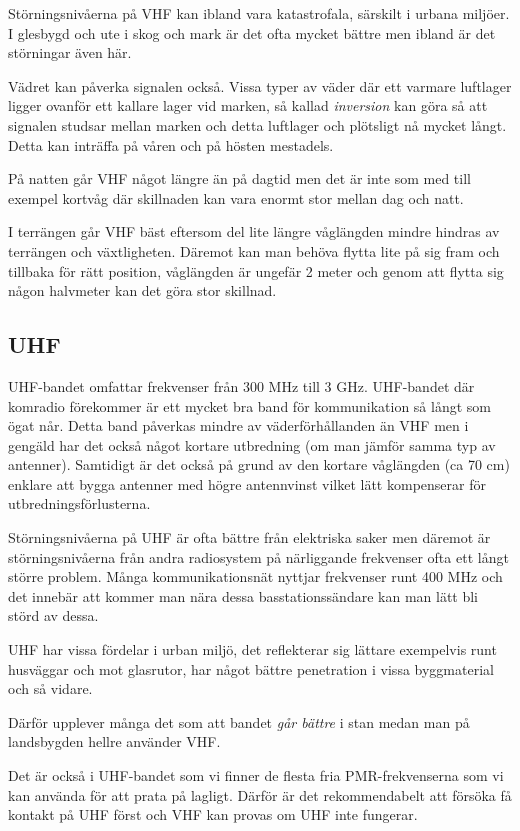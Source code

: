 Störningsnivåerna på VHF kan ibland vara katastrofala, särskilt i urbana miljöer. I glesbygd och ute i skog och mark är det ofta mycket bättre men ibland är det störningar även här. 

Vädret kan påverka signalen också. Vissa typer av väder där ett varmare luftlager ligger ovanför ett kallare lager vid marken, så kallad \textit{inversion} kan göra så att signalen studsar mellan marken och detta luftlager och plötsligt nå mycket långt. Detta kan inträffa på våren och på hösten mestadels.

På natten går VHF något längre än på dagtid men det är inte som med till exempel kortvåg där skillnaden kan vara enormt stor mellan dag och natt.

I terrängen går VHF bäst eftersom del lite längre våglängden mindre hindras av terrängen och växtligheten. Däremot kan man behöva flytta lite på sig fram och tillbaka för rätt position, våglängden är ungefär 2 meter och genom att flytta sig någon halvmeter kan det göra stor skillnad.

\subsection{UHF}

UHF-bandet omfattar frekvenser från 300 MHz till 3 GHz. UHF-bandet där komradio förekommer är ett mycket bra band för kommunikation så långt som ögat når. Detta band påverkas mindre av väderförhållanden än VHF men i gengäld har det också något kortare utbredning (om man jämför samma typ av antenner). Samtidigt är det också på grund av den kortare våglängden (ca 70 cm) enklare att bygga antenner med högre antennvinst vilket lätt kompenserar för utbredningsförlusterna.

Störningsnivåerna på UHF är ofta bättre från elektriska saker men däremot är störningsnivåerna från andra radiosystem på närliggande frekvenser ofta ett långt större problem. Många kommunikationsnät nyttjar frekvenser runt 400 MHz och det innebär att kommer man nära dessa basstationssändare kan man lätt bli störd av dessa.

UHF har vissa fördelar i urban miljö, det reflekterar sig lättare exempelvis runt husväggar och mot glasrutor, har något bättre penetration i vissa byggmaterial och så vidare.

Därför upplever många det som att bandet \textit{går bättre} i stan medan man på landsbygden hellre använder VHF.

Det är också i UHF-bandet som vi finner de flesta fria PMR-frekvenserna som vi kan använda för att prata på lagligt. Därför är det rekommendabelt att försöka få kontakt på UHF först och VHF kan provas om UHF inte fungerar.

